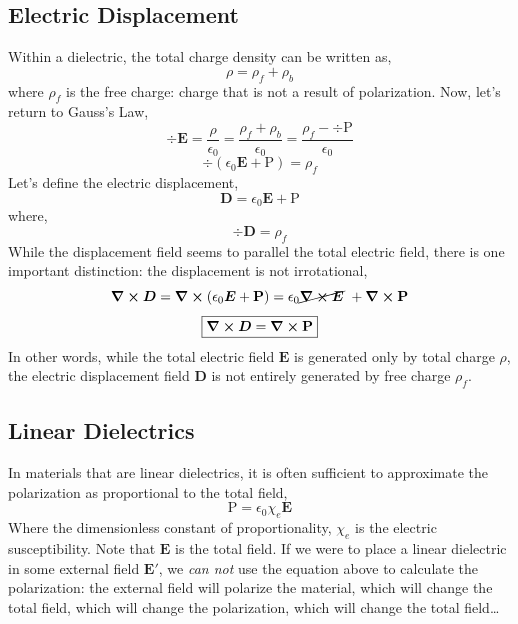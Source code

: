 \documentclass[12pt]{report}
\numberwithin{equation}{section}
\def\P{{\mbox{$\boldsymbol{\mathrm{P}}$}}}
\def\E{{\mbox{$\boldsymbol{E}$}}}
\renewcommand{\b}[1]{\boldsymbol{#1}}
\begin{document}
	\subsection{Electric Displacement}
	Within a dielectric, the total charge density can be written as,
	\begin{equation}
		\rho = \rho_f +\rho_b
	\end{equation}
	where $ \rho_f$ is the free charge: charge that is not a result of polarization. Now, let's return to Gauss's Law,
	\begin{equation}
		\div \E = \frac{\rho}{\epsilon_0} =  \frac{ \rho_f +\rho_b}{\epsilon_0}  = \frac{\rho_f -\div\P}{\epsilon_0} 
	\end{equation}
	\begin{equation}
		\div \left(\epsilon_0\E + \P\right) = \rho_f
	\end{equation}
	Let's define the electric displacement,
	\begin{equation}
		\boxed{\b{D} = \epsilon_0\E + \P}
	\end{equation}
	where,
	\begin{equation}
		\boxed{\div\b{D}= \rho_f}
	\end{equation}
	While the displacement field seems to parallel the total electric field, there is one important distinction: the displacement is not irrotational,
	\begin{equation}
		\curl \b{D} = \curl \left(\epsilon_0\E + \P\right) = \epsilon_0\cancel{\curl \E } \ + \curl \P
	\end{equation}
	\begin{equation}
		\boxed{\curl \b{D} = \curl \P}
	\end{equation}
	In other words, while the total electric field $ \E $ is generated only by total charge $ \rho $, the electric displacement field $ \b{D} $ is not entirely generated by free charge $ \rho_f $.
	
	\subsection{Linear Dielectrics}
	In materials that are linear dielectrics, it is often sufficient to approximate the polarization as proportional to the total field,
	\begin{equation}
		\P = \epsilon_0\chi_e \E
	\end{equation}
	Where the dimensionless constant of proportionality, $ \chi_e $ is the electric susceptibility. Note that $ \E $ is the total field. If we were to place a linear dielectric in some external field $ \E' $, we \textit{can not }use the equation above to calculate the polarization: the external field will polarize the material, which will change the total field, which will change the polarization, which will change the total field\ldots
	
\end{document}

